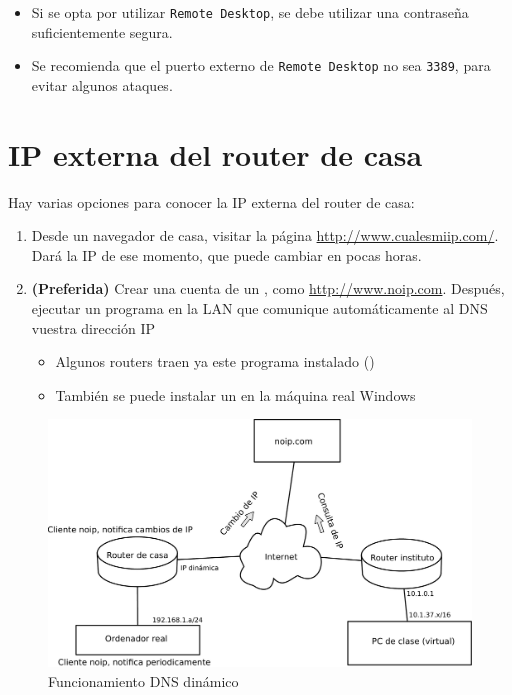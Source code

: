 \begin{Aviso}
  \begin{itemize}
  \item Si se opta por utilizar \texttt{Remote Desktop}, se debe utilizar una contraseña suficientemente segura.
  \item Se recomienda que el puerto externo de \texttt{Remote Desktop} no sea \texttt{3389}, para evitar algunos ataques.
  \end{itemize}
\end{Aviso}

\section{IP externa del router de casa}
Hay varias opciones para conocer la IP externa del router de casa:
\begin{enumerate}
\item Desde un navegador de casa, visitar la página \url{http://www.cualesmiip.com/}. Dará la IP de ese momento, que puede cambiar en pocas horas.
\item \textbf{(Preferida)} Crear una cuenta de un , como \url{http://www.noip.com}. Después, ejecutar un programa en la LAN que comunique automáticamente al DNS vuestra dirección IP
  \begin{itemize}
  \item Algunos routers traen ya este programa instalado ()
  \item También se puede instalar un  en la máquina real Windows 
  \end{itemize}
\end{enumerate}

\begin{figure}[h]
  \begin{center}
    \includegraphics[width=.9\textwidth]{./media/practica-vpn-dyndns.pdf}
  \end{center}
  \caption{Funcionamiento DNS dinámico}\label{fig:dns-dinamico}
\end{figure}


